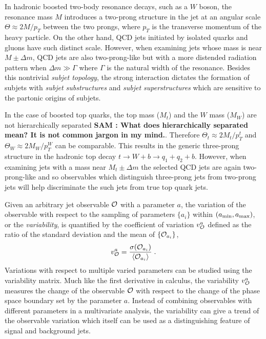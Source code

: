 \documentclass[aps,prl,floatfix,preprintnumbers,twocolumn,groupedaddress,nofootinbib]{revtex4-1}
\newcommand{\be}{\begin{equation}}
\newcommand{\ee}{\end{equation}}
\begin{document}
In hadronic boosted two-body resonance decays, such as a $W$ boson, the resonance mass $M$ introduces a two-prong structure in the jet at an angular scale $\Theta\approx 2M/p_T$ between the two prongs, where $p_T$ is the transverse momentum of the heavy particle. On the other hand, QCD jets initiated by isolated quarks and gluons have such distinct scale. However, when examining jets whose mass is near $M\pm\Delta m$, QCD jets are also two-prong-like but with a more distended radiation pattern when $\Delta m\gg\Gamma$ where $\Gamma$ is the natural width of the resonance. Besides this nontrivial {\sl subjet topology}, the strong interaction dictates the formation of subjets with {\sl subjet substructures} and {\sl subjet superstructures} \cite{Gallicchio:2010sw} which are sensitive to the partonic origins of subjets. 

In the case of boosted top quarks, the top mass ($M_t$) and the $W$ mass ($M_W$) are not hierarchically separated \textbf{\color{blue} SAM : What does hierarchically separated mean? It is not common jargon in my mind.}.  Therefore $\Theta_t \approx 2M_t/p_T^t$ and $\Theta_W \approx 2M_W/p_T^W$ can be comparable. This results in the generic three-prong structure in the hadronic top decay $t\rightarrow W+b \rightarrow q_1 + q_2 +b$. However, when examining jets with a mass near $M_t\pm \Delta m$ the selected QCD jets are again two-prong-like and so observables which distinguish three-prong jets from two-prong jets will help discriminate the such jets from true top quark jets.

Given an arbitrary jet observable $\cal O$ with a parameter $a$,
the variation of the observable with respect to the sampling of parameters $\{a_i\}$ within $(a_{\rm min},a_{\rm max})$, or the {\sl variability}, is quantified by the coefficient of variation $v_{\cal O}^a$ defined as the ratio of the standard deviation and the mean of $\{{\cal O}_{a_i}\}$,
\be
    v_{\cal O}^a = \frac{\sigma({\cal O}_{a_i})}{\langle {\cal O}_{a_i}\rangle}\;.
\ee
Variations with respect to multiple varied parameters can be studied using the variability matrix. Much like the first derivative in calculus, the variability $v_{\cal O}^a$ measures the change of the observable $\cal O$ with respect to the change of the phase space boundary set by the parameter $a$. Instead of combining observables with different parameters in a multivariate analysis, the variability can give a trend of the observable variation which itself can be used as a distinguishing feature of signal and background jets.
\end{document}
